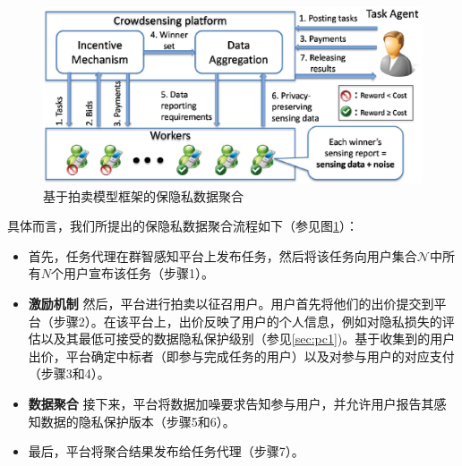 	\begin{figure}[h!]
		\vspace{-0.0cm}
		\centering
		\includegraphics[scale=0.75]{./pic/sys.eps}
				\vspace{-0.2cm}
		\caption{基于拍卖模型框架的保隐私数据聚合}\label{fg:sys}
		\vspace{-0.3cm}
	\end{figure}
	具体而言，我们所提出的保隐私数据聚合流程如下（参见图\ref{fg:sys}）：
	\begin{itemize}
		\item 首先，任务代理在群智感知平台上发布任务，然后将该任务向用户集合$\mathcal{N}$中所有$N$个用户宣布该任务（步骤1）。
		\item {\bfseries 激励机制} 然后，平台进行拍卖以征召用户。用户首先将他们的出价提交到平台（步骤2）。在该平台上，出价反映了用户的个人信息，例如对隐私损失的评估以及其最低可接受的数据隐私保护级别（参见\ref{sec:pc1})。基于收集到的用户出价，平台确定中标者（即参与完成任务的用户）以及对参与用户的对应支付（步骤3和4）。
		\item {\bfseries 数据聚合} 接下来，平台将数据加噪要求告知参与用户，并允许用户报告其感知数据的隐私保护版本（步骤5和6）。
		\item 最后，平台将聚合结果发布给任务代理（步骤7）。
	\end{itemize}
	
